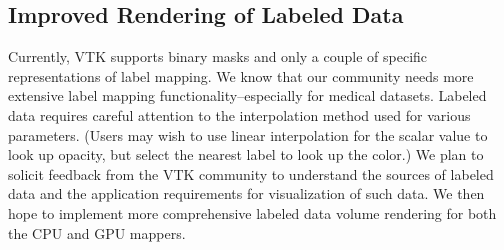 \subsection{Improved Rendering of Labeled Data}
\label{improved-rendering-of-labeled-data}
Currently, VTK supports binary masks and only a couple of specific representations
of label mapping. We know that our community needs more extensive label mapping
functionality--especially for medical datasets. Labeled data requires careful
attention to the interpolation method used for various parameters. (Users may wish
to use linear interpolation for the scalar value to look up opacity, but select 
the nearest label to look up the color.) We
plan to solicit feedback from the VTK community to understand the sources of
labeled data and the application requirements for visualization of such data. We
then hope to implement more comprehensive labeled data volume rendering for both
the CPU and GPU mappers.
